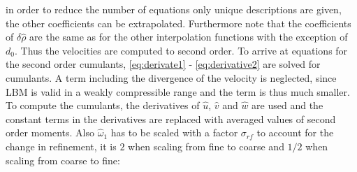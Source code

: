 in order to reduce the number of equations only unique descriptions are given, the other coefficients can be extrapolated. Furthermore note that the coefficients of $\delta \hat{\rho}$ are the same as for the other interpolation functions with the exception of $d_0$.
Thus the velocities are computed to second order. To arrive at equations for the second order cumulants, \eqref{eq:derivate1} - \eqref{eq:derivative2} are solved for cumulants. A term including the divergence of the velocity is neglected, since LBM is valid in a weakly compressible range and the term is thus much smaller. To compute the cumulants, the derivatives of $\hat{u}$, $\hat{v}$ and $\hat{w}$ are used and the constant terms in the derivatives are replaced with averaged values of second order moments. Also $\hat{\omega}_1$ has to be scaled with a factor $\sigma_{rf}$ to account for the change in refinement, it is $2$ when scaling from fine to coarse and $1/2$ when scaling from coarse to fine:
